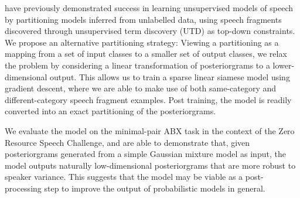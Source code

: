 \textcite{jansen2013weak} have previously demonstrated success in learning unsupervised models of speech by partitioning models inferred from unlabelled data, using speech fragments discovered through unsupervised term discovery (UTD) as top-down constraints.
We propose an alternative partitioning strategy: Viewing a partitioning as a mapping from a set of input classes to a smaller set of output classes, we relax the problem by considering a linear transformation of posteriorgrams to a lower-dimensional output.
This allows us to train a sparse linear siamese model using gradient descent, where we are able to make use of both same-category and different-category speech fragment examples.
Post training, the model is readily converted into an exact partitioning of the posteriorgrams.

We evaluate the model on the minimal-pair ABX task in the context of the Zero Resource Speech Challenge, and are able to demonstrate that, given posteriorgrams generated from a simple Gaussian mixture model as input, the model outputs naturally low-dimensional posteriorgrams that are more robust to speaker variance.
This suggests that the model may be viable as a post-processing step to improve the output of probabilistic models in general.

